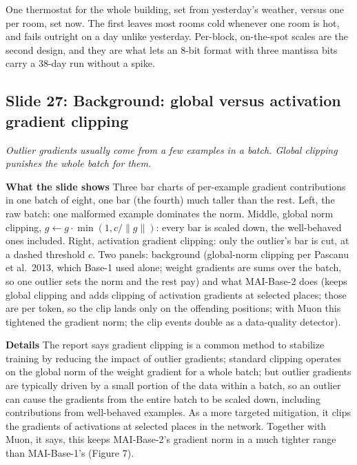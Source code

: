 \documentclass[11pt,letterpaper]{article}
\newcommand{\slide}[3]{%
  \subsection[Slide #1: #2]{Slide #1: #2}%
  {\color{muted}\itshape #3\par}\medskip}
\newcommand{\para}[1]{\medskip\noindent\textbf{#1}\quad}
\newenvironment{intuition}{\begin{tcolorbox}[intuitionbox]}{\end{tcolorbox}}
\begin{document}
\begin{intuition}
One thermostat for the whole building, set from yesterday's weather, versus one per room, set now. The first leaves most rooms cold whenever one room is hot, and fails outright on a day unlike yesterday. Per-block, on-the-spot scales are the second design, and they are what lets an 8-bit format with three mantissa bits carry a 38-day run without a spike.
\end{intuition}

\slide{27}{Background: global versus activation gradient clipping}{Outlier gradients usually come from a few examples in a batch. Global clipping punishes the whole batch for them.}

\para{What the slide shows} Three bar charts of per-example gradient contributions in one batch of eight, one bar (the fourth) much taller than the rest. Left, the raw batch: one malformed example dominates the norm. Middle, global norm clipping, $g\leftarrow g\cdot\min(1,c/\|g\|)$: every bar is scaled down, the well-behaved ones included. Right, activation gradient clipping: only the outlier's bar is cut, at a dashed threshold $c$. Two panels: background (global-norm clipping per Pascanu et al.\ 2013, which Base-1 used alone; weight gradients are sums over the batch, so one outlier sets the norm and the rest pay) and what MAI-Base-2 does (keeps global clipping and adds clipping of activation gradients at selected places; those are per token, so the clip lands only on the offending positions; with Muon this tightened the gradient norm; the clip events double as a data-quality detector).

\para{Details} The report says gradient clipping is a common method to stabilize training by reducing the impact of outlier gradients; standard clipping operates on the global norm of the weight gradient for a whole batch; but outlier gradients are typically driven by a small portion of the data within a batch, so an outlier can cause the gradients from the entire batch to be scaled down, including contributions from well-behaved examples. As a more targeted mitigation, it clips the gradients of activations at selected places in the network. Together with Muon, it says, this keeps MAI-Base-2's gradient norm in a much tighter range than MAI-Base-1's (Figure 7).
\end{document}
